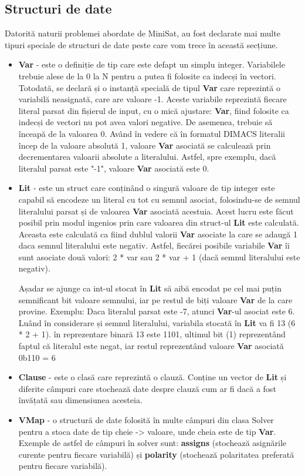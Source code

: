 \documentclass{llncs}
\begin{document}
\subsection{Structuri de date}
Datorită naturii problemei abordate de MiniSat, au fost declarate mai multe tipuri speciale de structuri de date peste care vom trece în această secțiune.
\begin{itemize}
    \item \textbf{Var} - este o definiție de tip care este defapt un simplu integer. Variabilele trebuie alese de la 0 la N pentru a putea fi folosite ca indecși în vectori. Totodată, se declară și o instanță specială de tipul \textbf{Var} care reprezintă o variabilă neasignată, care are valoare -1. Aceste variabile reprezintă fiecare literal parsat din fișierul de input, cu o mică ajustare: \textbf{Var}, fiind folosite ca indecși de vectori nu pot avea valori negative. De asemenea, trebuie să înceapă de la valoarea 0. Având în vedere că în formatul DIMACS literalii încep de la valoare absolută 1, valoare \textbf{Var} asociată se calculează prin decrementarea valoarii absolute a literalului. Astfel, spre exemplu, dacă literalul parsat este "-1", valoare \textbf{Var} asociată este 0.
    \item \textbf{Lit} - este un struct care conținând o singură valoare de tip integer este capabil să encodeze un literal cu tot cu semnul asociat, folosindu-se de semnul literalului parsat și de valoarea \textbf{Var} asociată acestuia. Acest lucru este făcut posibil prin modul ingenios prin care valoarea din struct-ul \textbf{Lit} este calculată. Aceasta este calculată ca fiind dublul valorii \textbf{Var} asociate la care se adaugă 1 daca semnul literalului este negativ. Astfel, fiecărei posibile variabile \textbf{Var} îi sunt asociate două valori: 2 * var sau 2 * var + 1 (dacă semnul literalului este negativ).
    
    Așadar se ajunge ca int-ul stocat în \textbf{Lit} să aibă encodat pe cel mai puțin semnificant bit valoare semnului, iar pe restul de biți valoare \textbf{Var} de la care provine. Exemplu: Daca literalul parsat este -7, atunci \textbf{Var}-ul asociat este 6. Luând în considerare și semnul literalului, variabila stocată în \textbf{Lit} va fi 13 (6 * 2 + 1). în reprezentare binară 13 este 1101, ultimul bit (1) reprezentând faptul că literalul este negat, iar restul reprezentând valoare \textbf{Var} asociată 0b110 = 6
    \item \textbf{Clause} - este o clasă care reprezintă o clauză. Conține un vector de \textbf{Lit} și diferite câmpuri care stochează date despre clauză cum ar fi dacă a fost învățată sau dimensiunea acesteia.
    \item \textbf{VMap} - o structură de date folosită în multe câmpuri din clasa Solver pentru a stoca date de tip cheie -> valoare, unde cheia este de tip \textbf{Var}. Exemple de astfel de câmpuri în solver sunt: \textbf{assigns} (stochează asignările curente pentru fiecare variabilă) și \textbf{polarity} (stochează polaritatea preferată pentru fiecare variabilă).    
\end{itemize}
\end{document}

